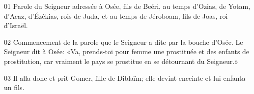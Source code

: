 01 Parole du Seigneur adressée à Osée, fils de Beéri, au temps d’Ozias, de Yotam, d’Acaz, d’Ézékias, rois de Juda, et au temps de Jéroboam, fils de Joas, roi d’Israël.

02 Commencement de la parole que le Seigneur a dite par la bouche d’Osée. Le Seigneur dit à Osée: «Va, prends-toi pour femme une prostituée et des enfants de prostitution, car vraiment le pays se prostitue en se détournant du Seigneur.»

03 Il alla donc et prit Gomer, fille de Diblaïm; elle devint enceinte et lui enfanta un fils.
